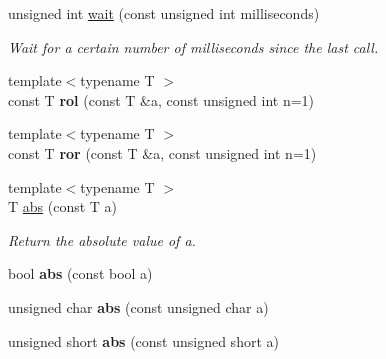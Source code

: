 \begin{DoxyCompactItemize}
\item 
unsigned int \hyperlink{namespacecimg__library_1_1cimg_a3c8917c0f12139bff6de6e3e45fc5b77}{wait} (const unsigned int milliseconds)
\begin{DoxyCompactList}\small\item\em Wait for a certain number of milliseconds since the last call. \item\end{DoxyCompactList}\item 
\hypertarget{namespacecimg__library_1_1cimg_a8bf7ed077577c097a254af6b7196193c}{
{\footnotesize template$<$typename T $>$ }\\const T {\bfseries rol} (const T \&a, const unsigned int n=1)}
\label{namespacecimg__library_1_1cimg_a8bf7ed077577c097a254af6b7196193c}

\item 
\hypertarget{namespacecimg__library_1_1cimg_a19c4ae79e13c144c55331397acaa26f5}{
{\footnotesize template$<$typename T $>$ }\\const T {\bfseries ror} (const T \&a, const unsigned int n=1)}
\label{namespacecimg__library_1_1cimg_a19c4ae79e13c144c55331397acaa26f5}

\item 
\hypertarget{namespacecimg__library_1_1cimg_a5dd0a4d361e2db646f5042be6bfe1d31}{
{\footnotesize template$<$typename T $>$ }\\T \hyperlink{namespacecimg__library_1_1cimg_a5dd0a4d361e2db646f5042be6bfe1d31}{abs} (const T a)}
\label{namespacecimg__library_1_1cimg_a5dd0a4d361e2db646f5042be6bfe1d31}

\begin{DoxyCompactList}\small\item\em Return the absolute value of {\ttfamily a}. \item\end{DoxyCompactList}\item 
\hypertarget{namespacecimg__library_1_1cimg_af5f808f6fa9ca3ad976c23afe87435c3}{
bool {\bfseries abs} (const bool a)}
\label{namespacecimg__library_1_1cimg_af5f808f6fa9ca3ad976c23afe87435c3}

\item 
\hypertarget{namespacecimg__library_1_1cimg_aea32f4d823641a7d99b8553877ea5fc3}{
unsigned char {\bfseries abs} (const unsigned char a)}
\label{namespacecimg__library_1_1cimg_aea32f4d823641a7d99b8553877ea5fc3}

\item 
\hypertarget{namespacecimg__library_1_1cimg_acf4a4407c0e89381169790b5edd98732}{
unsigned short {\bfseries abs} (const unsigned short a)}
\label{namespacecimg__library_1_1cimg_acf4a4407c0e89381169790b5edd98732}


\end{DoxyCompactItemize}
